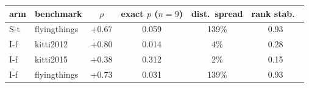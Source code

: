 \begin{tabular}{llcccc}
\toprule
arm & benchmark & $\rho$ & exact $p$ ($n{=}9$) & dist.\ spread & rank stab.\ \\
\midrule
S-t & flyingthings & +0.67 & 0.059 & 139\% & 0.93 \\
I-f & kitti2012 & +0.80 & 0.014 & 4\% & 0.28 \\
I-f & kitti2015 & +0.38 & 0.312 & 2\% & 0.15 \\
I-f & flyingthings & +0.73 & 0.031 & 139\% & 0.93 \\
\bottomrule
\end{tabular}

